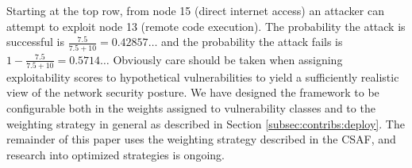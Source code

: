 Starting at the top row, from node 15 (direct internet access) an attacker can attempt to exploit node 13 (remote code execution). The probability the attack is successful is $\frac{7.5}{7.5 + 10}=0.42857\dots$ and the probability the attack fails is $1 - \frac{7.5}{7.5 + 10} = 0.5714\dots$ Obviously care should be taken when assigning exploitability scores to hypothetical vulnerabilities to yield a sufficiently realistic view of the network security posture. We have designed the framework to be configurable both in the weights assigned to vulnerability classes and to the weighting strategy in general as described in Section \ref{subsec:contribs:deploy}. The remainder of this paper uses the weighting strategy described in the CSAF, and research into optimized strategies is ongoing. 


